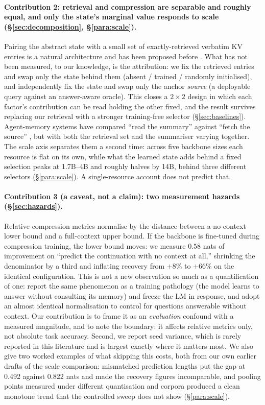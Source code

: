 \documentclass[11pt]{article}
\begin{document}
\paragraph{Contribution 2: retrieval and compression are separable and roughly
equal, and only the state's marginal value responds to scale
(\S\ref{sec:decomposition}, \S\ref{para:scale}).}
Pairing the abstract state with a small set of exactly-retrieved verbatim KV
entries is a natural architecture and has been proposed before
\citep{strongdrafts,specache}. What has not been measured, to our knowledge, is
the attribution: we fix the retrieved entries and swap only the state behind
them (absent / trained / randomly initialised), and independently fix the state
and swap only the anchor \emph{source} (a deployable query against an
answer-aware oracle). This closes a $2\times2$ design in which each factor's
contribution can be read holding the other fixed, and the result survives
replacing our retrieval with a stronger training-free selector
(\S\ref{sec:baselines}). Agent-memory systems have
compared ``read the summary'' against ``fetch the source''
\citep{justmem,infinimemory}, but with both the retrieval set and the summariser
varying together. The scale axis separates them a second time: across five
backbone sizes each resource is flat on its own, while what the learned state
adds behind a fixed selection peaks at 1.7B--4B and roughly halves by 14B, behind
three different selectors (\S\ref{para:scale}). A single-resource account does
not predict that.

\paragraph{Contribution 3 (a caveat, not a claim): two measurement hazards
(\S\ref{sec:hazards}).}
Relative compression metrics normalise by the distance between a no-context
lower bound and a full-context upper bound. If the backbone is fine-tuned during
compression training, the lower bound moves: we measure $0.58$ nats of
improvement on ``predict the continuation with no context at all,'' shrinking the
denominator by a third and inflating recovery from $+8\%$ to $+66\%$ on the
identical configuration. This is not a new observation so much as a
quantification of one: \citet{ccm} report the same phenomenon as a training
pathology (the model learns to answer without consulting its memory) and freeze
the LM in response, and \citet{simplecc} adopt an almost identical normalisation
to control for questions answerable without context. Our contribution is to
frame it as an \emph{evaluation} confound with a measured magnitude, and to note
the boundary: it affects relative metrics only, not absolute task accuracy.
Second, we report seed variance, which is rarely reported in this literature and
is largest exactly where it matters most. We also give two worked examples of
what skipping this costs, both from our own earlier drafts of the scale
comparison: mismatched prediction lengths put the gap at 0.492 against 0.822
nats and made the recovery figures incomparable, and pooling points measured
under different quantisation and corpora produced a clean monotone trend that
the controlled sweep does not show (\S\ref{para:scale}).
\end{document}

